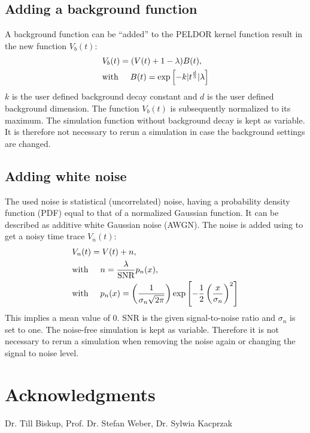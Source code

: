 \documentclass[pdftex,bezier,german,a4,twoside, headexclude,12pt,nochapterprefix, titlepage]{extarticle}
\begin{document}
\subsection{Adding a background function}
A background function can be ``added'' to the PELDOR kernel function result in the new function $V_{b}(t)$: 
\begin{align}
\begin{split}
&V_{b}(t) = (V(t)+1-\lambda)B(t), \\
&\mbox{with}\hspace{0.5cm}B(t) = \mathrm{exp}\left[-k|t^{\frac{d}{3}}|\lambda \right]
\label{background_function}
\end{split}
\end{align}
$k$ is the user defined background decay constant and $d$ is the user defined background dimension. The 
function $V_{b}(t)$ is subsequently normalized to its maximum.
The simulation function without background decay is kept as variable. It is therefore not necessary to rerun a simulation in 
case the background settings are changed.
\subsection{Adding white noise}
The used noise is statistical (uncorrelated) noise, having a probability density function (PDF) equal to that of a normalized Gaussian function.
It can be described as additive white Gaussian noise (AWGN). The noise is added using to get a noisy time trace $V_n(t)$:
\begin{align}
\begin{split}
 & V_n(t) = V(t)+n,\\
 &\mbox{with}\hspace{0.5cm} n = \dfrac{\lambda}{\text{SNR}}p_n(x), \\
 &\mbox{with}\hspace{0.5cm} p_n(x) = \left(\dfrac{1}{\sigma_n \sqrt{2\pi}}\right)
 \mathrm{exp}\left[-\frac{1}{2}\left(\frac{x}{\sigma_n}\right)^2\right]
 \end{split}
\end{align}
This implies a mean value of $0$. SNR is the given signal-to-noise ratio and $\sigma_n$ is set to one.
The noise-free simulation is kept as variable. Therefore it is not necessary to rerun a simulation when removing the noise again or
changing the signal to noise level.
\newpage
\section{Acknowledgments}
Dr. Till Biskup,
Prof. Dr. Stefan Weber,
Dr. Sylwia Kacprzak
\end{document}
